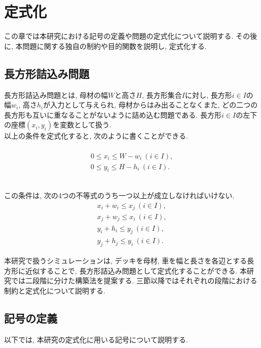 \chapter{定式化}\label{formulation}

この章では本研究における記号の定義や問題の定式化について説明する. 
その後に, 本問題に関する独自の制約や目的関数を説明し, 定式化する. \\

\section{長方形詰込み問題}
長方形詰込み問題とは, 母材の幅$W$と高さ$H$, 長方形集合$I$に対し, 長方形$i \in I$の幅$w_i$, 高さ$h_i$が入力として与えられ, 母材からはみ出ることなくまた, どの二つの長方形も互いに重なることがないように詰め込む問題である\cite{rect-pack}. 
長方形$i \in I$の左下の座標$(x_i, y_i)$を変数として扱う. \\
以上の条件を定式化すると, 次のように書くことができる. \\
\\
\begin{eqnarray}
    0 \leq x_i \leq W-w_i \ (i \in I), \\
    0 \leq y_i \leq H-h_i \ (i \in I). 
\end{eqnarray}

\\
この条件は, 次の4つの不等式のうち一つ以上が成立しなければいけない.  
\begin{eqnarray}
    x_i + w_i \leq x_j \ (i \in I), \\
    x_j + w_j \leq x_i \ (i \in I), \\
    y_i + h_i \leq y_j \ (i \in I), \\
    y_j + h_j \leq y_i \ (i \in I). 
\end{eqnarray}

本研究で扱うシミュレーションは, デッキを母材, 車を幅と長さを各辺とする長方形に近似することで, 長方形詰込み問題として定式化することができる. 
本研究では二段階に分けた構築法を提案する. 
三節以降ではそれぞれの段階における制約と定式化について説明する. 

\clearpage


\section{記号の定義}
以下では, 本研究の定式化に用いる記号について説明する. 


